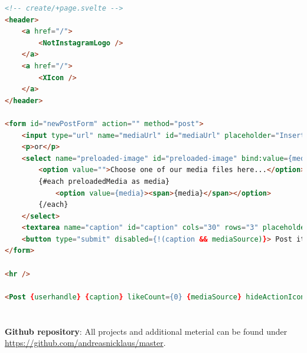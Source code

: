 \documentclass[a4paper, 10pt]{article}
\makeatletter
\renewcommand\listoffigures{%
  \section{\listfigurename}%
  \@mkboth{\MakeUppercase\listfigurename}{\MakeUppercase\listfigurename}%
  \@starttoc{lof}%
}
\renewcommand\listoftables{%
  \section{\listtablename}%
  \@mkboth{\MakeUppercase\listtablename}{\MakeUppercase\listtablename}%
  \@starttoc{lot}%
}
\makeatother
\begin{document}
\begin{lstlisting}[caption=Create in Svelte (Template), label={lst:Svelte:Create:Template}, language=HTML, firstnumber=20]
<!-- create/+page.svelte -->
<header>
	<a href="/">
		<NotInstagramLogo />
	</a>
	<a href="/">
		<XIcon />
	</a>
</header>

<form id="newPostForm" action="" method="post">
	<input type="url" name="mediaUrl" id="mediaUrl" placeholder="Insert your media URL here..." bind:value={mediaUrl}/>
	<p>or</p>
	<select name="preloaded-image" id="preloaded-image" bind:value={mediaChoice}>
		<option value="">Choose one of our media files here...</option>
		{#each preloadedMedia as media}
			<option value={media}><span>{media}</span></option>
		{/each}
	</select>
	<textarea name="caption" id="caption" cols="30" rows="3" placeholder="Type your caption here" bind:value={caption} />
	<button type="submit" disabled={!(caption && mediaSource)}> Post it! </button>
</form>

<hr />

<Post {userhandle} {caption} likeCount={0} {mediaSource} hideActionIcons={true} />
\end{lstlisting}


\pagebreak

\listoffigures

\listoftables
\glsaddall
\printnoidxglossary[
  type=\acronymtype,
  style=long
]

\nocite{*}
{}

\vfill
\textbf{Github repository}: All projects and additional meterial can be found under \url{https://github.com/andreasnicklaus/master}.
\end{document}
